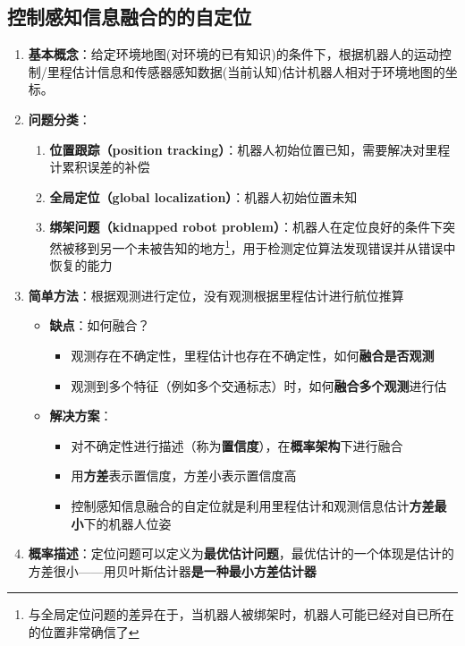 \documentclass[../main.tex]{subfiles}
\begin{document}
\subsection{控制感知信息融合的的自定位}\label{sec:markov}
\begin{enumerate}
    \item \textbf{基本概念}：给定环境地图(对环境的已有知识)的条件下，根据机器人的运动控制/里程估计信息和传感器感知数据(当前认知)估计机器人相对于环境地图的坐标。
    \item \textbf{问题分类}：
    \begin{enumerate}
        \item \textbf{位置跟踪（position tracking）}：机器人初始位置已知，需要解决对里程计累积误差的补偿
        \item \textbf{全局定位（global localization）}：机器人初始位置未知
        \item \textbf{绑架问题（kidnapped robot problem）}：机器人在定位良好的条件下突然被移到另一个未被告知的地方\footnote{与全局定位问题的差异在于，当机器人被绑架时，机器人可能已经对自已所在的位置非常确信了}，用于检测定位算法发现错误并从错误中恢复的能力
    \end{enumerate}
    \item \textbf{简单方法}：根据观测进行定位，没有观测根据里程估计进行航位推算
        \begin{itemize}
            \item \textbf{缺点}：如何融合？
                \begin{itemize}
                    \item 观测存在不确定性，里程估计也存在不确定性，如何\textbf{融合是否观测}
                    \item 观测到多个特征（例如多个交通标志）时，如何\textbf{融合多个观测}进行估
                \end{itemize}
            \item \textbf{解决方案}：
                \begin{itemize}
                    \item 对不确定性进行描述（称为\textbf{置信度}），在\textbf{概率架构}下进行融合
                    \item 用\textbf{方差}表示置信度，方差小表示置信度高
                    \item 控制感知信息融合的自定位就是利用里程估计和观测信息估计\textbf{方差最小}下的机器人位姿
                \end{itemize}
        \end{itemize}
    \item \textbf{概率描述}：定位问题可以定义为\textbf{最优估计问题}，最优估计的一个体现是估计的方差很小——用贝叶斯估计器\textbf{是一种最小方差估计器}\\

\end{enumerate}
\end{document}
